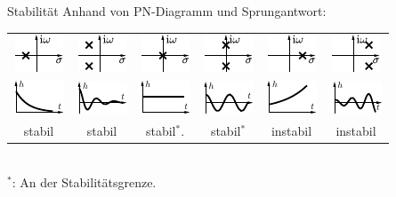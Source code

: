 \documentclass[fs, footer]{latex4ei}
\begin{document}
\begin{multicols*}{4}
{Stabilität Anhand von PN-Diagramm und Sprungantwort:\\
\setlength{\tabcolsep}{1mm}
\begin{tabular}{@{\extracolsep\fill}cccccc@{}} 
\includegraphics{./img/blocks/PN_1.pdf} & \includegraphics{./img/blocks/PN_2.pdf} & \includegraphics{./img/blocks/PN_3.pdf} & \includegraphics{./img/blocks/PN_4.pdf} & \includegraphics{./img/blocks/PN_5.pdf} & \includegraphics{./img/blocks/PN_6.pdf} \\
\includegraphics{./img/blocks/PN_1h.pdf} & \includegraphics{./img/blocks/PN_2h.pdf} & \includegraphics{./img/blocks/PN_3h.pdf} & \includegraphics{./img/blocks/PN_4h.pdf} & \includegraphics{./img/blocks/PN_5h.pdf} & \includegraphics{./img/blocks/PN_6h.pdf} \\
stabil & stabil & stabil$^*$. & stabil$^*$ & instabil & instabil\\
\end{tabular}\\
$^*$: An der Stabilitätsgrenze.\\




}
\end{multicols*}
\end{document}
